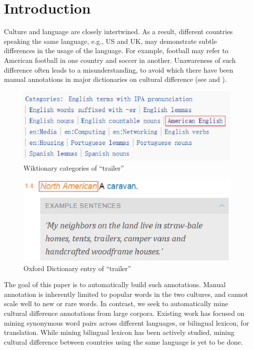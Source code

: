 \section{Introduction}

Culture and language are closely intertwined.
As a result, different countries speaking the same language, e.g.,
US and UK, may demonstrate subtle differences in the usage
of the language.
For example, football may refer to American football in one country
and soccer in another.
Unawareness of such difference often leads to a misunderstanding,
to avoid which there have been manual annotations in major dictionaries
on cultural difference (see  and ).

\begin{figure}[h]
\includegraphics[width=0.9\linewidth]{img/wiki}
\caption{Wiktionary categories of ``trailer''}
\label{fig:wiki}
\end{figure}

\begin{figure}[h]
\includegraphics[width=0.9\linewidth]{img/oxford}
\caption{Oxford Dictionary entry of ``trailer''}
\label{fig:ox}
\end{figure}

The goal of this paper is to automatically build such annotations.
Manual annotation is inherently limited to popular words in the two
cultures, and cannot scale well to new or rare words.
In contrast, we seek to automatically mine cultural difference annotations
from large corpora. Existing work has focused on mining
synonymous word pairs across
different languages\cite{Mikolov:2013tp}, or bilingual lexicon\cite{linard2015bilingual}, for translation.
While mining bilingual lexicon has been actively studied,
mining cultural difference between countries using the same language
is yet to be done.



